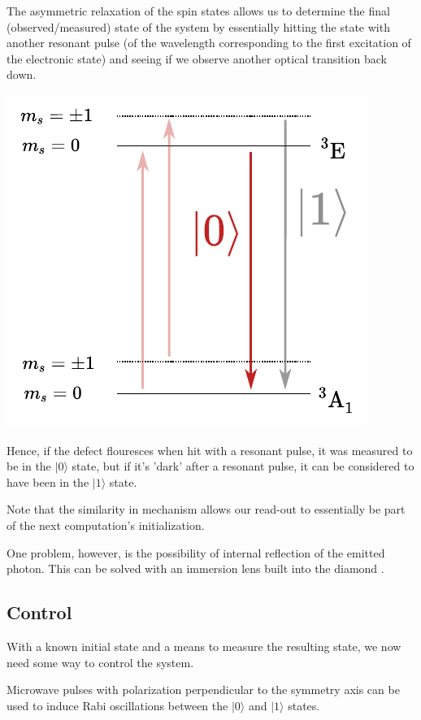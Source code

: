 \documentclass[10pt,a4paper]{article}
\begin{document}
\begin{multicols}{2}
The asymmetric relaxation of the spin states allows us to determine the final (observed/measured) state of the system by essentially hitting the state with another resonant pulse (of the wavelength corresponding to the first excitation of the electronic state) and seeing if we observe another optical transition back down.
\begin{center}
\includegraphics[scale=0.76]{energy_measure.pdf}
\end{center}
Hence, if the defect flouresces when hit with a resonant pulse, it was measured to be in the $\vert 0 \rangle$ state, but if it's 'dark' after a resonant pulse, it can be considered to have been in the $\vert 1 \rangle$ state.

Note that the similarity in mechanism allows our read-out to essentially be part of the next computation's initialization.


One problem, however, is the possibility of internal reflection of the emitted photon. This can be solved with an immersion lens built into the diamond \cite{hadden2010strongly}.

\subsection{Control}
With a known initial state and a means to measure the resulting state, we now need some way to control the system. 

Microwave pulses with polarization perpendicular to the symmetry axis can be used to induce Rabi oscillations between the $\vert 0 \rangle$ and $\vert 1 \rangle$ states. 


\end{multicols}
\end{document}
